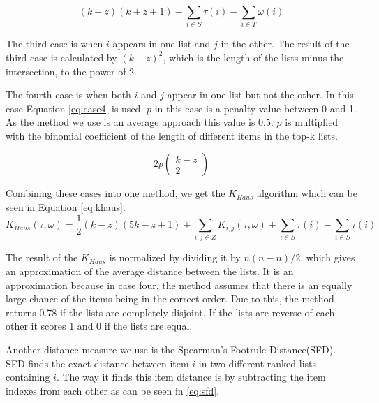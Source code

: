 \begin{equation}\label{eq:case2}
(k-z)(k+z+1)- \sum_{i \in S} \tau(i)- \sum_{i \in T} \omega(i)
\end{equation}

The third case is when $i$ appears in one list and $j$ in the other. The result of the third case is calculated by $(k-z)^2$, which is the length of the lists minus the intersection, to the power of 2.

The fourth case is when both $i$ and $j$ appear in one list but not the other. In this case Equation \ref{eq:case4} is used. $p$ in this case is a penalty value between 0 and 1. As the method we use is an average approach this value is 0.5. $p$ is multiplied with the binomial coefficient of the length of different items in the top-k lists.

\begin{equation}\label{eq:case4}
2p\left(\!
    \begin{array}{c}
      k-z \\
      2
    \end{array}
  \!\right)
\end{equation}


Combining these cases into one method, we get the $K_{Haus}$ algorithm which can be seen in Equation \ref{eq:khaus}. 
\footnotesize
\begin{equation}\label{eq:khaus}
K_{Haus}(\tau,\omega) = \frac{1}{2}(k-z)(5k-z+1)+ \sum_{i,j \in Z} K_{i,j}(\tau,\omega) + \sum_{i \in S}\tau(i) - \sum_{i \in S}\tau(i)
\end{equation}
\normalsize

The result of the $K_{Haus}$ is normalized by dividing it by $n(n-n)/2$, which gives an approximation of the average distance between the lists. It is an approximation because in case four, the method assumes that there is an equally large chance of the items being in the correct order. Due to this, the method returns 0.78 if the lists are completely disjoint. If the lists are reverse of each other it scores 1 and 0 if the lists are equal. %


Another distance measure we use is the Spearman's Footrule Distance(SFD). SFD finds the exact distance between item $i$ in two different ranked lists containing $i$. The way it finds this item distance is by subtracting the item indexes from each other as can be seen in \ref{eq:sfd}. 

